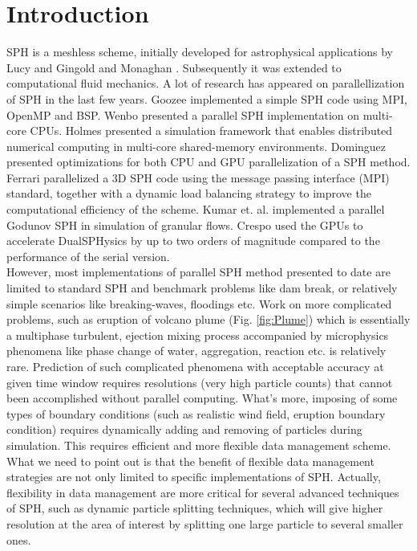 \documentclass[conference,compsoc]{IEEEtran}
\begin{document}
\section{Introduction}
SPH is a meshless scheme, initially developed for astrophysical applications by Lucy \cite{lucy1977numerical} and Gingold and Monaghan \cite{gingold1977smoothed}. 
Subsequently it was extended to computational fluid mechanics. 
A lot of research has appeared on parallellization of SPH in the last few years. 
Goozee \cite{goozee2003distributed} implemented a simple SPH code using MPI, OpenMP and BSP. 
Wenbo \cite{wenbo2014performance} presented a parallel SPH implementation on multi-core CPUs. 
Holmes \cite{holmes2011framework} presented a simulation framework that enables distributed numerical computing in multi-core shared-memory environments. 
Dominguez \cite{dominguez2011optimization} presented optimizations for both CPU and GPU parallelization of a SPH method. 
Ferrari \cite{ferrari2009new} parallelized a 3D SPH code using the message passing interface (MPI) standard, together with a dynamic load balancing strategy to improve the computational efficiency of the scheme. 
Kumar et. al. \cite{kumar2013parallel} implemented a parallel Godunov SPH in simulation of granular flows.
Crespo \cite{crespo2015dualsphysics} used the GPUs to accelerate DualSPHysics by up to two orders of magnitude compared to the performance of the serial version.\\
However, most implementations of parallel SPH method presented to date are limited to standard SPH and benchmark problems like dam break, or relatively
simple scenarios like breaking-waves, floodings etc. Work on more complicated problems, such as eruption of volcano plume (Fig. \ref{fig:Plume}) which is essentially a multiphase turbulent,
ejection mixing process accompanied by microphysics phenomena like phase change of water, aggregation, reaction etc. is relatively rare. 
Prediction of such complicated phenomena with acceptable accuracy at given time window requires resolutions (very high particle counts) that cannot been accomplished without parallel computing. What's more, imposing of some types of boundary conditions (such as realistic wind field, eruption boundary condition) requires dynamically adding and removing of particles during simulation. This requires efficient and more flexible data management scheme. What we need to point out is that the benefit of flexible data management strategies are not only limited to specific implementations of SPH. Actually, flexibility in data management are more critical for several advanced techniques of SPH, such as dynamic particle splitting techniques\cite{vacondio2012accurate, feldman2007dynamic}, which will give higher resolution at the area of interest by splitting one large particle to several smaller ones.
\end{document}
